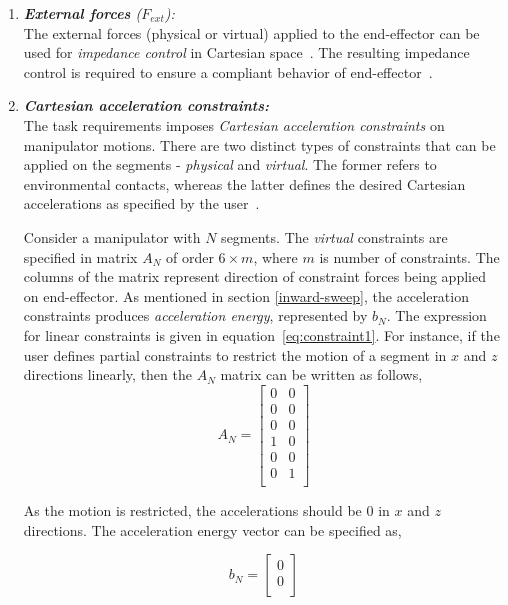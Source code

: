 \begin{enumerate}
	\item \textit{\textbf{External forces} ($F_{ext}$):} \\
	The external forces (physical or virtual) applied to the end-effector can be used for \textit{impedance control} in Cartesian space~\cite{siciliano2016springer}. The resulting impedance control is required to ensure a compliant behavior of end-effector~\cite{albu2002cartesian}. 
	
	\item \textit{\textbf{Cartesian acceleration constraints:}} \\
	The task requirements imposes \textit{Cartesian acceleration constraints} on manipulator motions. There are two distinct types of constraints that can be applied on the segments - \textit{physical} and \textit{virtual}. The former refers to environmental contacts, whereas the latter defines the desired Cartesian accelerations as specified by the user~\cite{shakhimardanov2015composable}. 
	
	Consider a manipulator with $N$ segments. The \textit{virtual} constraints are specified in matrix $A_N$ of order $6 \times m$, where $m$ is number of constraints. The columns of the matrix represent direction of constraint forces being applied on end-effector. As mentioned in section \ref{inward-sweep}, the acceleration constraints produces \textit{acceleration energy}, represented by $b_N$. The expression for linear constraints is given in equation~\ref{eq:constraint1}. For instance, if the user defines partial constraints to restrict the motion of a segment in $x$ and $z$ directions linearly, then the $A_N$ matrix can be written as follows,
	\begin{equation}\label{eq:A}
	A_N = 	\begin{bmatrix}
	0 & 0 \\
	0 & 0 \\
	0 & 0 \\
	1 & 0 \\
	0 & 0 \\
	0 & 1 \\
	\end{bmatrix} 	
	\end{equation}
	
	As the motion is restricted, the accelerations should be $0$ in $x$ and $z$ directions. The acceleration energy vector can be specified as, 
	
	\begin{equation} \label{eq:bN}
	b_N = \begin{bmatrix}
	0 \\ 
	0 \\
	\end{bmatrix}
	\end{equation}
	

\end{enumerate}
